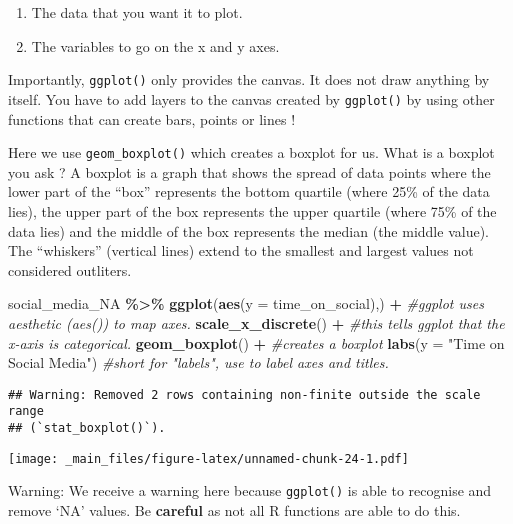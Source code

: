 \documentclass[
]{book}
\newenvironment{Shaded}{\begin{snugshade}}{\end{snugshade}}
\newcommand{\AttributeTok}[1]{\textcolor[rgb]{0.13,0.29,0.53}{#1}}
\newcommand{\CommentTok}[1]{\textcolor[rgb]{0.56,0.35,0.01}{\textit{#1}}}
\newcommand{\FunctionTok}[1]{\textcolor[rgb]{0.13,0.29,0.53}{\textbf{#1}}}
\newcommand{\NormalTok}[1]{#1}
\newcommand{\SpecialCharTok}[1]{\textcolor[rgb]{0.81,0.36,0.00}{\textbf{#1}}}
\newcommand{\StringTok}[1]{\textcolor[rgb]{0.31,0.60,0.02}{#1}}
\begin{document}
\begin{enumerate}
\def\labelenumi{\arabic{enumi}.}
\item
  The data that you want it to plot.
\item
  The variables to go on the x and y axes.
\end{enumerate}

Importantly, \texttt{ggplot()} only provides the canvas. It does not draw anything by itself. You have to add layers to the canvas created by \texttt{ggplot()} by using other functions that can create bars, points or lines !

Here we use \texttt{geom\_boxplot()} which creates a boxplot for us. What is a boxplot you ask ? A boxplot is a graph that shows the spread of data points where the lower part of the ``box'' represents the bottom quartile (where 25\% of the data lies), the upper part of the box represents the upper quartile (where 75\% of the data lies) and the middle of the box represents the median (the middle value). The ``whiskers'' (vertical lines) extend to the smallest and largest values not considered outliters.

\begin{Shaded}
\begin{Highlighting}[]
\NormalTok{social\_media\_NA }\SpecialCharTok{\%\textgreater{}\%}
\FunctionTok{ggplot}\NormalTok{(}\FunctionTok{aes}\NormalTok{(}\AttributeTok{y =}\NormalTok{ time\_on\_social),) }\SpecialCharTok{+} \CommentTok{\#ggplot uses aesthetic (aes()) to map axes. }
  \FunctionTok{scale\_x\_discrete}\NormalTok{() }\SpecialCharTok{+} \CommentTok{\#this tells ggplot that the x{-}axis is categorical.}
  \FunctionTok{geom\_boxplot}\NormalTok{() }\SpecialCharTok{+} \CommentTok{\#creates a boxplot}
  \FunctionTok{labs}\NormalTok{(}\AttributeTok{y =} \StringTok{"Time on Social Media"}\NormalTok{) }\CommentTok{\#short for "labels", use to label axes and titles.}
\end{Highlighting}
\end{Shaded}

\begin{verbatim}
## Warning: Removed 2 rows containing non-finite outside the scale range
## (`stat_boxplot()`).
\end{verbatim}

\texttt{[image: \_main\_files/figure-latex/unnamed-chunk-24-1.pdf]}

Warning: We receive a warning here because \texttt{ggplot()} is able to recognise and remove `NA' values. Be \textbf{careful} as not all R functions are able to do this.
\end{document}
